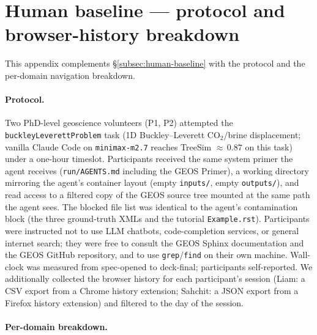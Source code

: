 \documentclass{article}
\begin{document}
\section{Human baseline --- protocol and browser-history breakdown}
\label{app:human-browser}

This appendix complements \S\ref{subsec:human-baseline} with the protocol and the per-domain navigation breakdown.

\paragraph{Protocol.} Two PhD-level geoscience volunteers (P1, P2) attempted the \texttt{buckleyLeverettProblem} task (1D Buckley--Leverett CO$_2$/brine displacement; vanilla Claude Code on \texttt{minimax-m2.7} reaches TreeSim ${\approx}\,0.87$ on this task) under a one-hour timeslot. Participants received the same system primer the agent receives (\texttt{run/AGENTS.md} including the GEOS Primer), a working directory mirroring the agent's container layout (empty \texttt{inputs/}, empty \texttt{outputs/}), and read access to a filtered copy of the GEOS source tree mounted at the same path the agent sees. The blocked file list was identical to the agent's contamination block (the three ground-truth XMLs and the tutorial \texttt{Example.rst}). Participants were instructed not to use LLM chatbots, code-completion services, or general internet search; they were free to consult the GEOS Sphinx documentation and the GEOS GitHub repository, and to use \texttt{grep}/\texttt{find} on their own machine. Wall-clock was measured from spec-opened to deck-final; participants self-reported. We additionally collected the browser history for each participant's session (Liam: a CSV export from a Chrome history extension; Sahchit: a JSON export from a Firefox history extension) and filtered to the day of the session.

\paragraph{Per-domain breakdown.}
\end{document}
